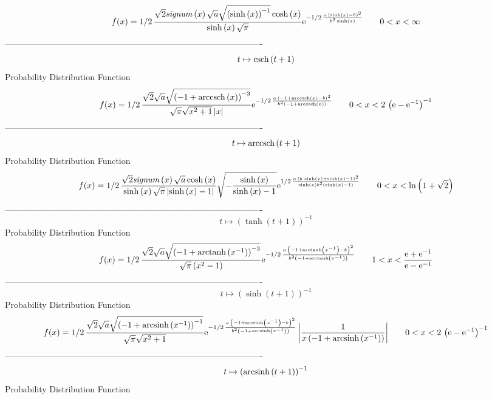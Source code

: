 \documentclass[12pt]{article}
\begin{document}
$$  f(x)=1/2\,{\frac {\sqrt {2}{\it signum} \left( x \right) \sqrt {a}\sqrt {
 \left( \sinh \left( x \right)  \right) ^{-1}}\cosh \left( x \right) 
}{\sinh \left( x \right) \sqrt {\pi}}{{\rm e}^{-1/2\,{\frac {a\,
 \left( \sinh \left( x \right) -b \right) ^{2}}{{b}^{2}\sinh \left( x
 \right) }}}}}
 \qquad0
 < x < \infty 
$$-------------------------------------------------------------------------------------------  \\$$t\mapsto {\rm csch} \left(t+1\right)
$$Probability Distribution Function 
$$  f(x)=1/2\,{\frac {\sqrt {2}\sqrt {a}\sqrt { \left( -1+{\rm arccsch} \left(x
\right) \right) ^{-3}}}{\sqrt {\pi}\sqrt {{x}^{2}+1} \left| x \right| 
}{{\rm e}^{-1/2\,{\frac {a\, \left( -1+{\rm arccsch} \left(x\right)-b
 \right) ^{2}}{{b}^{2} \left( -1+{\rm arccsch} \left(x\right) \right) 
}}}}}
 \qquad0
 < x < 2\, \left( {\rm e}-{{\rm e}^{-1}} \right) ^{-1}
$$-------------------------------------------------------------------------------------------  \\$$t\mapsto {\rm arccsch} \left(t+1\right)
$$Probability Distribution Function 
$$  f(x)=1/2\,{\frac {\sqrt {2}{\it signum} \left( x \right) \sqrt {a}\cosh
 \left( x \right) }{\sinh \left( x \right) \sqrt {\pi} \left| \sinh
 \left( x \right) -1 \right| }\sqrt {-{\frac {\sinh \left( x \right) 
}{\sinh \left( x \right) -1}}}{{\rm e}^{1/2\,{\frac {a\, \left( b\,
\sinh \left( x \right) +\sinh \left( x \right) -1 \right) ^{2}}{\sinh
 \left( x \right) {b}^{2} \left( \sinh \left( x \right) -1 \right) }}}
}}
 \qquad0
 < x < \ln  \left( 1+\sqrt {2} \right) 
$$-------------------------------------------------------------------------------------------  \\$$t\mapsto  \left( \tanh \left( t+1 \right)  \right) ^{-1}
$$Probability Distribution Function 
$$  f(x)=1/2\,{\frac {\sqrt {2}\sqrt {a}\sqrt { \left( -1+{\rm arctanh} \left({
x}^{-1}\right) \right) ^{-3}}}{\sqrt {\pi} \left( {x}^{2}-1 \right) }{
{\rm e}^{-1/2\,{\frac {a\, \left( -1+{\rm arctanh} \left({x}^{-1}
\right)-b \right) ^{2}}{{b}^{2} \left( -1+{\rm arctanh} \left({x}^{-1}
\right) \right) }}}}}
 \qquad1
 < x < {\frac {{\rm e}+{{\rm e}^{-1}}}{{\rm e}-{{\rm e}^{-1}}}}
$$-------------------------------------------------------------------------------------------  \\$$t\mapsto  \left( \sinh \left( t+1 \right)  \right) ^{-1}
$$Probability Distribution Function 
$$  f(x)=1/2\,{\frac {\sqrt {2}\sqrt {a}\sqrt { \left( -1+{\rm arcsinh} \left({
x}^{-1}\right) \right) ^{-1}}}{\sqrt {\pi}\sqrt {{x}^{2}+1}}{{\rm e}^{
-1/2\,{\frac {a\, \left( -1+{\rm arcsinh} \left({x}^{-1}\right)-b
 \right) ^{2}}{{b}^{2} \left( -1+{\rm arcsinh} \left({x}^{-1}\right)
 \right) }}}} \left| {\frac {1}{x \left( -1+{\rm arcsinh} \left({x}^{-
1}\right) \right) }} \right| }
 \qquad0
 < x < 2\, \left( {\rm e}-{{\rm e}^{-1}} \right) ^{-1}
$$-------------------------------------------------------------------------------------------  \\$$t\mapsto  \left( {\rm arcsinh} \left(t+1\right) \right) ^{-1}
$$Probability Distribution Function 
\end{document}
